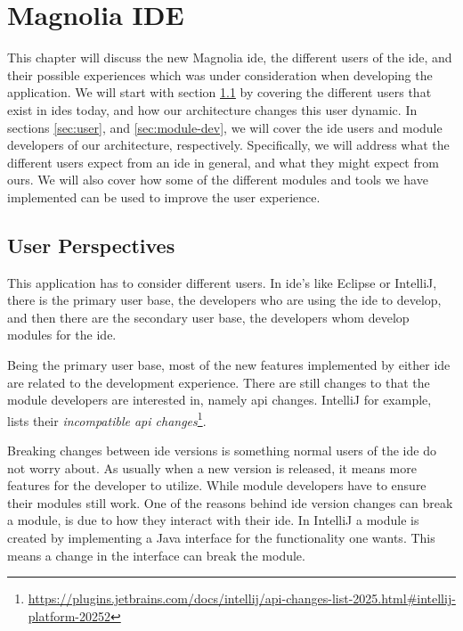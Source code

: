 \chapter{Magnolia IDE} \label{cha:ide}

This chapter will discuss the new Magnolia \gls*{ide}, the different users of the
\gls*{ide}, and their possible experiences which was under consideration when
developing the application. We will start with section \ref{sec:up} by covering
the different users that exist in \gls*{ide}s today, and how our architecture
changes this user dynamic. In sections \ref{sec:user}, and \ref{sec:module-dev},
we will cover the \gls*{ide} users and module developers of our architecture,
respectively. Specifically, we will address what the different users expect from
an \gls*{ide} in general, and what they might expect from ours. We will also
cover how some of the different modules and tools we have implemented can be
used to improve the user experience.


\section{User Perspectives} \label{sec:up}

This application has to consider different users. In \gls*{ide}'s like
Eclipse or IntelliJ, there is the primary user base, the developers
who are using the \gls*{ide} to develop, and then there are the secondary user
base, the developers whom develop modules for the \gls*{ide}.

Being the primary user base, most of the new features implemented by either
\gls*{ide} are related to the development experience. There are still changes to
that the module developers are interested in, namely \gls*{api} changes.
IntelliJ for example, lists their \textit{incompatible \gls*{api} changes}\footnote{\url{https://plugins.jetbrains.com/docs/intellij/api-changes-list-2025.html\#intellij-platform-20252}}.

Breaking changes between \gls*{ide} versions is something normal users of the
\gls*{ide} do not worry about. As usually when a new version is released, it
means more features for the developer to utilize. While module
developers have to ensure their modules still work. One of the reasons
behind \gls*{ide} version changes can break a module, is due to how
they interact with their \gls*{ide}. In IntelliJ a module is
created by implementing a Java interface for the functionality one wants. This
means a change in the interface can break the module.

